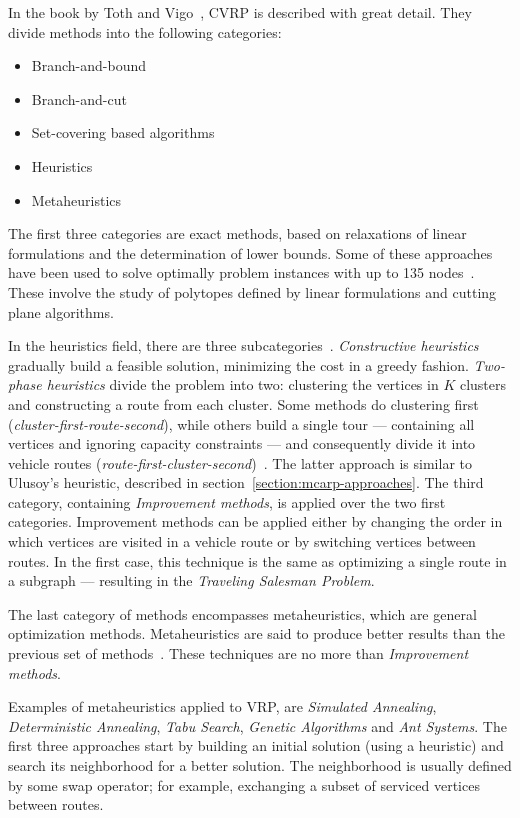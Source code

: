 In the book by Toth and Vigo~\citep{Toth01book}, CVRP is described with great detail.
They divide methods into the following categories:

\begin{itemize}
	\item Branch-and-bound
	\item Branch-and-cut
	\item Set-covering based algorithms
	\item Heuristics
	\item Metaheuristics
\end{itemize}

The first three categories are exact methods, based on relaxations of linear
formulations and the determination of lower bounds. Some of these approaches
have been used to solve optimally problem instances with up to 135
nodes~\citep{Naddef01}. These involve the study of polytopes defined by linear
formulations and cutting plane algorithms.

In the heuristics field, there are three subcategories~\citep{Laporte01}.
\textit{Constructive heuristics} gradually build a feasible solution,
minimizing the cost in a greedy fashion. \textit{Two-phase heuristics} divide
the problem into two: clustering the vertices in $K$ clusters and constructing
a route from each cluster. Some methods do clustering first
(\textit{cluster-first-route-second}), while others build a single tour ---
containing all vertices and ignoring capacity constraints --- and consequently
divide it into vehicle routes
(\textit{route-first-cluster-second})~\citep{Tucker76}. The latter approach is
similar to Ulusoy's heuristic, described in
section~\ref{section:mcarp-approaches}. The third category, containing
\textit{Improvement methods}, is applied over the two first categories.
Improvement methods can be applied either by changing the order in which
vertices are visited in a vehicle route or by switching vertices between
routes. In the first case, this technique is the same as optimizing a single
route in a subgraph --- resulting in the \textit{Traveling Salesman Problem}.

The last category of methods encompasses metaheuristics, which are general
optimization methods. Metaheuristics are said to produce better results than
the previous set of methods~\citep{Gendreau01}. These techniques are no more
than \textit{Improvement methods}.

Examples of metaheuristics applied to VRP, are \textit{Simulated Annealing},
\textit{Deterministic Annealing}, \textit{Tabu Search}, \textit{Genetic
Algorithms} and \textit{Ant Systems}. The first three approaches start by
building an initial solution (using a heuristic) and search its neighborhood
for a better solution. The neighborhood is usually defined by some swap
operator; for example, exchanging a subset of serviced vertices between
routes.

